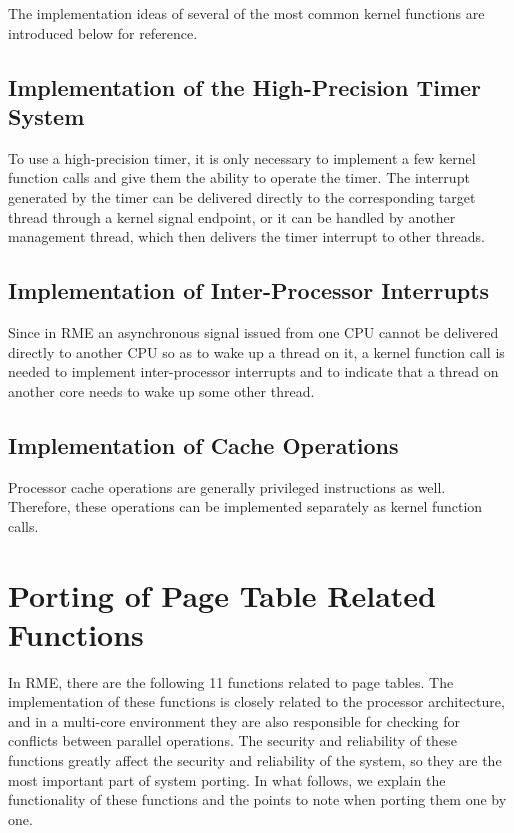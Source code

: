 The implementation ideas of several of the most common kernel functions are introduced below for reference.

\subsection{Implementation of the High-Precision Timer System}\label{subsec:7-high-precision-timer-system-implementation}

To use a high-precision timer, it is only necessary to implement a few kernel function calls and give them the ability to operate the timer. The interrupt generated by the timer can be delivered directly to the corresponding target thread through a kernel signal endpoint, or it can be handled by another management thread, which then delivers the timer interrupt to other threads.

\subsection{Implementation of Inter-Processor Interrupts}\label{subsec:7-inter-processor-interrupt-implementation}

Since in RME an asynchronous signal issued from one CPU cannot be delivered directly to another CPU so as to wake up a thread on it, a kernel function call is needed to implement inter-processor interrupts and to indicate that a thread on another core needs to wake up some other thread.

\subsection{Implementation of Cache Operations}\label{subsec:7-cache-operation-implementation}

Processor cache operations are generally privileged instructions as well. Therefore, these operations can be implemented separately as kernel function calls.

\section{Porting of Page Table Related Functions}\label{sec:7-page-table-function-porting}

In RME, there are the following 11 functions related to page tables. The implementation of these functions is closely related to the processor architecture, and in a multi-core environment they are also responsible for checking for conflicts between parallel operations. The security and reliability of these functions greatly affect the security and reliability of the system, so they are the most important part of system porting. In what follows, we explain the functionality of these functions and the points to note when porting them one by one.

